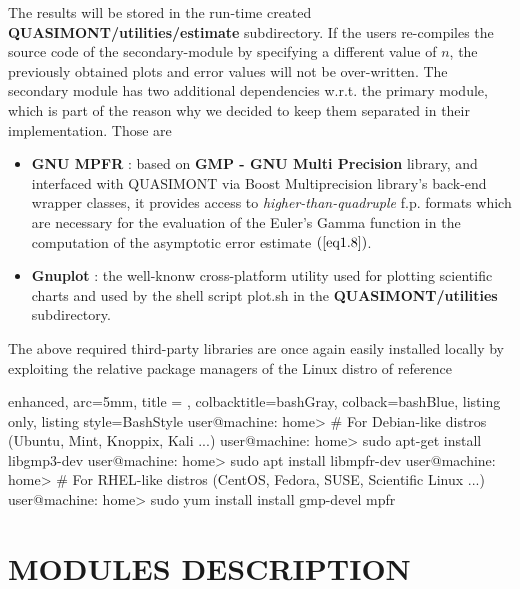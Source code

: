 \documentclass[a4paper, twosided]{book}
\begin{document}
\noindent
The results will be stored in the run-time created \colorbox{poliGrayBlue}{\textbf{QUASIMONT/utilities/estimate}} subdirectory. If the users re-compiles the source code of the secondary-module by specifying a different value of $n$, the previously obtained plots and error values will not be over-written.
The secondary module has two additional dependencies w.r.t. the primary module, which is part of the reason why we decided to keep them separated in their implementation. Those are
\begin{itemize}
    \item \color{poliDarkBlue} \textbf{GNU MPFR} \color{black}\cite{mpfr}: based on \color{poliDarkBlue} \textbf{GMP - GNU Multi Precision} \color{black} library, and interfaced with QUASIMONT via Boost Multiprecision library's back-end wrapper classes, it provides access to {\itshape higher-than-quadruple} f.p. formats which are necessary for the evaluation of the Euler's Gamma function in the computation of the asymptotic error estimate $(\ref{eq1.8})$.
    \item \color{poliDarkBlue} \textbf{Gnuplot} \color{black}: the well-knonw cross-platform utility used for plotting scientific charts and used by the shell script \colorbox{poliGrayBlue}{plot.sh} in the \colorbox{poliGrayBlue}{\textbf{QUASIMONT/utilities}} subdirectory.
\end{itemize}

\noindent
The above required third-party libraries are once again easily installed locally by exploiting the relative package managers of the Linux distro of reference

\vspace{0.5cm}
\begin{tcblisting}{enhanced,
                   arc=5mm,
                   title = \color{black}{\large \ttfamily Installation of third-party libraries for the secondary module},
                   colbacktitle=bashGray,
                   colback=bashBlue,
                   listing only,
                   listing style=BashStyle}
user@machine: home> # For Debian-like distros (Ubuntu, Mint, Knoppix, Kali ...)
user@machine: home> sudo apt-get install libgmp3-dev
user@machine: home> sudo apt install libmpfr-dev
user@machine: home> # For RHEL-like distros (CentOS, Fedora, SUSE, Scientific Linux ...)
user@machine: home> sudo yum install install gmp-devel mpfr
\end{tcblisting}
\vspace{0.5cm}

\chapter[Modules description]{\Huge \ttfamily MODULES DESCRIPTION}\label{Chap4}
\end{document}
